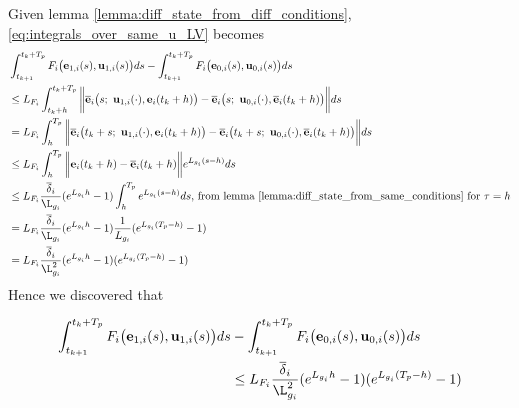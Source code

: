 Given lemma \eqref{lemma:diff_state_from_diff_conditions},
\eqref{eq:integrals_over_same_u_LV} becomes
\begin{align}
  &\int_{t_{k+1}}^{t_k + T_p} F_i \big(\vect{e}_{1,i}(s), \vect{u}_{1,i} (s)\big) d s
    - \int_{t_{k+1}}^{t_k + T_p} F_i \big(\vect{e}_{0,i}(s), \vect{u}_{0,i} (s)\big) d s \\
  &\leq L_{F_i}\int_{t_k+h}^{t_k + T_p} \bigg\| \overline{\vect{e}}_i\big(s;\ \vect{u}_{1,i} (\cdot), \vect{e}_i(t_k + h) \big)
    -  \overline{\vect{e}}_i\big(s;\ \vect{u}_{0,i} (\cdot), \overline{\vect{e}}_i(t_k + h)\big) \bigg\| d s \\
  & = L_{F_i}\int_{h}^{T_p} \bigg\| \overline{\vect{e}}_i\big(t_k + s;\ \vect{u}_{1,i} (\cdot), \vect{e}_i(t_k + h) \big)
    -  \overline{\vect{e}}_i\big(t_k + s;\ \vect{u}_{0,i} (\cdot), \overline{\vect{e}}_i(t_k + h)\big) \bigg\| d s \\
  & \leq L_{F_i}\int_{h}^{T_p} \bigg\| \vect{e}_i(t_k +h) - \overline{\vect{e}}_i(t_k + h) \bigg\| e^{L_{g_i}(s-h)} ds \\
  & \leq L_{F_i} \dfrac{\overline{\delta}_i}{\L_{g_i}} (e^{L_{g_i} h} - 1) \int_{h}^{T_p}  e^{L_{g_i}(s-h)} ds \text{, from lemma \eqref{lemma:diff_state_from_same_conditions} for } \tau = h \\
  & = L_{F_i} \dfrac{\overline{\delta}_i}{\L_{g_i}} (e^{L_{g_i} h} - 1) \dfrac{1}{L_{g_i}}(e^{L_{g_i}(T_p-h)} - 1) \\
  & = L_{F_i} \dfrac{\overline{\delta}_i}{\L_{g_i}^2} (e^{L_{g_i} h} - 1) (e^{L_{g_i}(T_p-h)} - 1)
\end{align}
Hence we discovered that
\begin{bw_box}
\begin{align}
  \int_{t_{k+1}}^{t_k + T_p} F_i \big(\vect{e}_{1,i}(s), \vect{u}_{1,i} (s)\big) d s
  &- \int_{t_{k+1}}^{t_k + T_p} F_i \big(\vect{e}_{0,i}(s), \vect{u}_{0,i} (s)\big) d s \\
  & \leq L_{F_i} \dfrac{\overline{\delta}_i}{\L_{g_i}^2} (e^{L_{g_i} h} - 1) (e^{L_{g_i}(T_p-h)} - 1)
\label{eq:end_result_two_integrals}
\end{align}
\end{bw_box}

